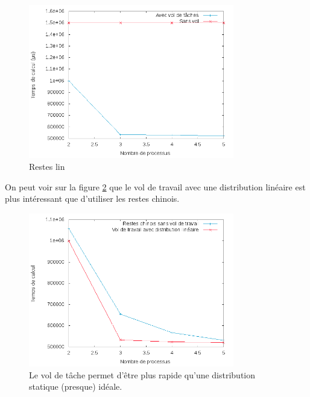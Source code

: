 \begin{figure}[H]
\centering
\includegraphics[width=0.8\textwidth]{vol_lin_lin}
\caption{Restes lin}
\label{vol_lin_lin}
\end{figure}
On peut voir sur la figure \ref{comp_chinois_vol} que le vol de travail avec une distribution linéaire est plus intéressant que d'utiliser les restes chinois.
\begin{figure}[H]
\centering
\includegraphics[width=0.8\textwidth]{comp_chinois_vol.png}
\caption{Le vol de tâche permet d'être plus rapide qu'une distribution statique (presque) idéale.}
\label{comp_chinois_vol}
\end{figure}

